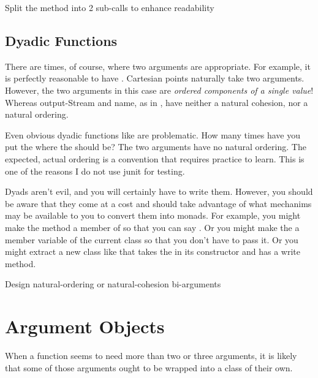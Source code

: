 \begin{marker}
Split the method into 2 sub-calls to enhance readability 
\end{marker}

\subsection{Dyadic Functions}

There are times, of course, where two arguments are appropriate. For example, it is perfectly reasonable to have . Cartesian points naturally take two arguments. However, the two arguments in this case are \textit{ordered components of a single value}! Whereas output-Stream and name, as in , have neither a natural cohesion, nor a natural ordering.

Even obvious dyadic functions like  are problematic.
How many times have you put the  where the  should be? The two arguments have no natural ordering. The expected, actual ordering is a convention that requires practice to learn. This is one of the reasons I do not use junit for testing.

Dyads aren't evil, and you will certainly have to write them. However, you should be aware that they come at a cost and should take advantage of what mechanims may be available to you to convert them into monads. For example, you might make the  method a member of  so that you can say . Or you might make the  a member variable of the current class so that you don't have to pass it. Or you might extract a new class like  that takes the  in its constructor and has a write method.

\begin{marker}
Design natural-ordering or natural-cohesion bi-arguments
\end{marker}

\section{Argument Objects}

When a function seems to need more than two or three arguments, it is likely that some of those arguments ought to be wrapped into a class of their own.

